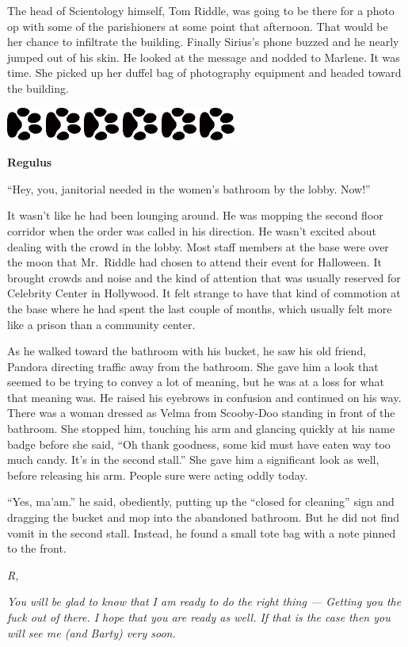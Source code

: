 \documentclass[12pt,twoside,openright]{memoir}
\newcommand{\myrulez}{	
	\begin{center}
		\hspace{.5em}
		\includegraphics[angle=60]{dogprint.pdf}
		\hspace{.5em}
		\includegraphics[angle=120]{dogprint.pdf}
		\hspace{.5em}
		\includegraphics[angle=60]{dogprint.pdf}
		\hspace{.5em}
		\includegraphics[angle=120]{dogprint.pdf}
		\hspace{.5em}
		\includegraphics[angle=60]{dogprint.pdf}
		\hspace{.5em}
		\includegraphics[angle=120]{dogprint.pdf}
		\hspace{.5em}
	\end{center}
}
\begin{document}
The head of Scientology himself, Tom Riddle, was going to be there for a photo op with some of the parishioners at some point that afternoon. That would be her chance to infiltrate the building. Finally Sirius's phone buzzed and he nearly jumped out of his skin. He looked at the message and nodded to Marlene. It was time. She picked up her duffel bag of photography equipment and headed toward the building.

\myrulez

\textbf{Regulus} 

``Hey, you, janitorial needed in the women's bathroom by the lobby. Now!'' 

It wasn't like he had been lounging around. He was mopping the second floor corridor when the order was called in his direction. He wasn't excited about dealing with the crowd in the lobby. Most staff members at the base were over the moon that Mr.\ Riddle had chosen to attend their event for Halloween. It brought crowds and noise and the kind of attention that was usually reserved for Celebrity Center in Hollywood. It felt strange to have that kind of commotion at the base where he had spent the last couple of months, which usually felt more like a prison than a community center.

As he walked toward the bathroom with his bucket, he saw his old friend, Pandora directing traffic away from the bathroom. She gave him a look that seemed to be trying to convey a lot of meaning, but he was at a loss for what that meaning was. He raised his eyebrows in confusion and continued on his way. There was a woman dressed as Velma from Scooby-Doo standing in front of the bathroom. She stopped him, touching his arm and glancing quickly at his name badge before she said, ``Oh thank goodness, some kid must have eaten way too much candy. It's in the second stall.'' She gave him a significant look as well, before releasing his arm. People sure were acting oddly today.

``Yes, ma'am.'' he said, obediently, putting up the ``closed for cleaning'' sign and dragging the bucket and mop into the abandoned bathroom. But he did not find vomit in the second stall. Instead, he found a small tote bag with a note pinned to the front. 

\textit{\newline R,} 

\textit{You will be glad to know that I am ready to do the right thing --- Getting you the fuck out of there. I hope that you are ready as well. If that is the case then you will see me (and Barty) very soon. }
\end{document}
